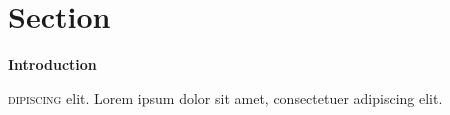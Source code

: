 \section[Introduction]{\fontsize{\customSecFontSize}{55}\selectfont Section }
	\vspace{\customSecPreDist}
	\begin{flushleft}
		{\fontsize{\customSecFontSizeAdd}{\customSecLineDistAdd}\selectfont\bfseries Introduction\par}
	\end{flushleft}
	\vspace{\customSecPostDist}
	\label{sec:sec1.introduction}

\vspace{\dropCapSecVertDist}\lettrine{\color{\lettrineDropCapFontColor}{A}}{dipiscing} elit. Lorem ipsum dolor sit amet, consectetuer adipiscing elit. \blindtext[5]
